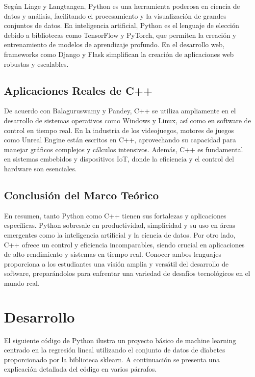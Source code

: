 \documentclass[12pt]{article}
\begin{document}
	Según Linge y Langtangen, Python es una herramienta poderosa en ciencia de datos y análisis, facilitando el procesamiento y la visualización de grandes conjuntos de datos. En inteligencia artificial, Python es el lenguaje de elección debido a bibliotecas como TensorFlow y PyTorch, que permiten la creación y entrenamiento de modelos de aprendizaje profundo. En el desarrollo web, frameworks como Django y Flask simplifican la creación de aplicaciones web robustas y escalables.
	
	\subsection{Aplicaciones Reales de C++}
	
	De acuerdo con Balaguruswamy y Pandey, C++ se utiliza ampliamente en el desarrollo de sistemas operativos como Windows y Linux, así como en software de control en tiempo real. En la industria de los videojuegos, motores de juegos como Unreal Engine están escritos en C++, aprovechando su capacidad para manejar gráficos complejos y cálculos intensivos. Además, C++ es fundamental en sistemas embebidos y dispositivos IoT, donde la eficiencia y el control del hardware son esenciales.
	
	\subsection*{Conclusión del Marco Teórico}
	
	En resumen, tanto Python como C++ tienen sus fortalezas y aplicaciones específicas. Python sobresale en productividad, simplicidad y su uso en áreas emergentes como la inteligencia artificial y la ciencia de datos. Por otro lado, C++ ofrece un control y eficiencia incomparables, siendo crucial en aplicaciones de alto rendimiento y sistemas en tiempo real. Conocer ambos lenguajes proporciona a los estudiantes una visión amplia y versátil del desarrollo de software, preparándolos para enfrentar una variedad de desafíos tecnológicos en el mundo real.
	\vspace{0.2cm}
	
	\section{Desarrollo}
	El siguiente código de Python ilustra un proyecto básico de machine learning centrado en la regresión lineal utilizando el conjunto de datos de diabetes proporcionado por la biblioteca sklearn. A continuación se presenta una explicación detallada del código en varios párrafos.
	
\end{document}
